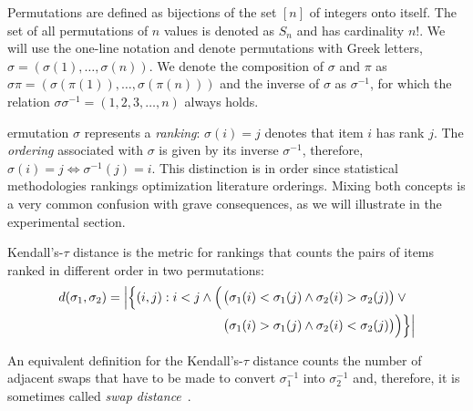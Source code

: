 \documentclass[sigconf,dvipsnames]{acmart}
\begin{document}
Permutations are defined as bijections of the set $[n]$ of integers onto itself. The set of all permutations of $n$ values is denoted as $S_n$ and has cardinality $n!$. We will use the one-line notation and denote permutations with Greek letters, $\sigma  = (\sigma(1), \ldots , \sigma(n))$. We denote the composition of $\sigma$ and $\pi$ as $\sigma\pi = (\sigma(\pi(1)), \ldots, \sigma(\pi(n)))$ and the inverse of $\sigma$ as $\sigma^{-1}$, for which the relation $\sigma\sigma^{-1}=(1, 2, 3, \dotsc,n)$ always holds.

ermutation $\sigma$ represents a \emph{ranking}:  $\sigma(i)=j$ denotes that item $i$ has rank $j$. The \emph{ordering} associated with $\sigma$ is given by its inverse $\sigma^{-1}$, therefore,  $\sigma(i)=j \Leftrightarrow  \sigma^{-1}(j)=i$. This distinction is in order since statistical methodologies  rankings  optimization literature  orderings. Mixing both concepts is a very common confusion with grave consequences, as we will illustrate in the experimental section.

Kendall's-$\tau$ distance is the metric for rankings that counts the pairs of items ranked in different order in two permutations:
%
\begin{equation}
\begin{split}
d(\sigma _{1},\sigma_{2})=\left\lvert\Bigl\{(i,j):i<j \land \phantom{}\Bigl(\right.&\bigl(\sigma_{1}(i) < \sigma_{1}(j)\land \sigma_{2}(i)>\sigma_{2}(j)\bigr)\lor \phantom{} \\
 &\bigl(\sigma_{1}(i)>\sigma_{1}(j)\land \sigma_{2}(i)<\sigma_{2}(j)\bigr)\Bigr)\Bigr\}\Bigr\rvert\\
 \end{split}
 \label{eq:kendall_decomp}
\end{equation}

An equivalent definition for the Kendall's-$\tau$ distance counts the number of adjacent swaps that have to be made to convert $\sigma_1^{-1}$ into $\sigma_2^{-1}$ and, therefore, it is sometimes called \emph{swap distance}~\citep{ZaeStoBar2014:ppsn}. 
\end{document}
